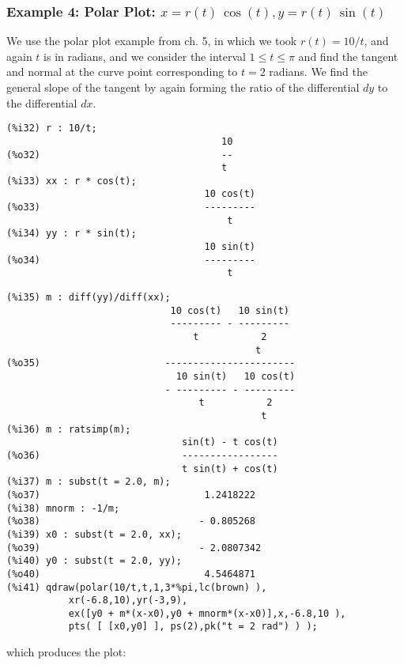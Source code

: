 \documentclass[12pt]{article}
\begin{document}
\subsubsection{Example 4: Polar Plot:   $x = r(t)\, \cos(t), y = r(t)\, \sin(t)$ }
We use the polar plot example from ch. 5, in which we took $r(t) = 10/t$, and
  again $t$ is in radians, and we consider the interval $ 1 \leq t \leq \pi$ and
  find the tangent and normal at the curve point corresponding to $t = 2$ radians.
We find the general slope of the tangent by again forming the ratio of the
  differential $dy$ to the differential $dx$.
\small
\begin{verbatim}
(%i32) r : 10/t;
                                      10
(%o32)                                --
                                      t
(%i33) xx : r * cos(t);
                                   10 cos(t)
(%o33)                             ---------
                                       t
(%i34) yy : r * sin(t);
                                   10 sin(t)
(%o34)                             ---------
                                       t
\end{verbatim}
\newpage
\begin{verbatim}
(%i35) m : diff(yy)/diff(xx);
                             10 cos(t)   10 sin(t)
                             --------- - ---------
                                 t           2
                                            t
(%o35)                      -----------------------
                              10 sin(t)   10 cos(t)
                            - --------- - ---------
                                  t           2
                                             t
(%i36) m : ratsimp(m);
                               sin(t) - t cos(t)
(%o36)                         -----------------
                               t sin(t) + cos(t)
(%i37) m : subst(t = 2.0, m);
(%o37)                             1.2418222
(%i38) mnorm : -1/m;
(%o38)                            - 0.805268
(%i39) x0 : subst(t = 2.0, xx);
(%o39)                            - 2.0807342
(%i40) y0 : subst(t = 2.0, yy);
(%o40)                             4.5464871
(%i41) qdraw(polar(10/t,t,1,3*%pi,lc(brown) ),
           xr(-6.8,10),yr(-3,9),
           ex([y0 + m*(x-x0),y0 + mnorm*(x-x0)],x,-6.8,10 ),
           pts( [ [x0,y0] ], ps(2),pk("t = 2 rad") ) );
\end{verbatim}
\normalsize
%
which produces the plot:
\end{document}
